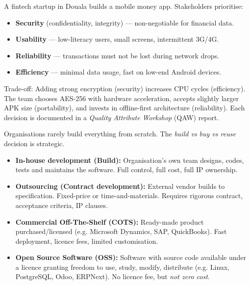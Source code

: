 \documentclass[11pt]{article}
\newcounter{popsec}
\newcounter{popsub}
\newcommand{\courssub}[1]{%
  \stepcounter{popsub}%
  \par\vspace{9pt}\noindent{\popxbold\fontsize{11.5}{13}\selectfont\color{popink}{\color{poporange}\thepopsec.\thepopsub}\hspace{6pt}#1}\par\nopagebreak\vspace{4pt}
}
\begin{document}
\begin{exemplebox}
A fintech startup in Douala builds a mobile money app. Stakeholders prioritise:
\begin{itemize}
\item \textbf{Security} (confidentiality, integrity) — non-negotiable for financial data.
\item \textbf{Usability} — low-literacy users, small screens, intermittent 3G/4G.
\item \textbf{Reliability} — transactions must not be lost during network drops.
\item \textbf{Efficiency} — minimal data usage, fast on low-end Android devices.
\end{itemize}
Trade-off: Adding strong encryption (security) increases CPU cycles (efficiency). The team chooses AES-256 with hardware acceleration, accepts slightly larger APK size (portability), and invests in offline-first architecture (reliability). Each decision is documented in a \emph{Quality Attribute Workshop} (QAW) report.
\end{exemplebox}

\courssub{Software Acquisition Options}

Organisations rarely build everything from scratch. The \emph{build vs buy vs reuse} decision is strategic.

\begin{definition}
\begin{itemize}
\item \textbf{In-house development (Build):} Organisation's own team designs, codes, tests and maintains the software. Full control, full cost, full IP ownership.
\item \textbf{Outsourcing (Contract development):} External vendor builds to specification. Fixed-price or time-and-materials. Requires rigorous contract, acceptance criteria, IP clauses.
\item \textbf{Commercial Off-The-Shelf (COTS):} Ready-made product purchased/licensed (e.g. Microsoft Dynamics, SAP, QuickBooks). Fast deployment, licence fees, limited customisation.
\item \textbf{Open Source Software (OSS):} Software with source code available under a licence granting freedom to use, study, modify, distribute (e.g. Linux, PostgreSQL, Odoo, ERPNext). No licence fee, but \emph{not zero cost}.
\end{itemize}
\end{definition}
\end{document}
